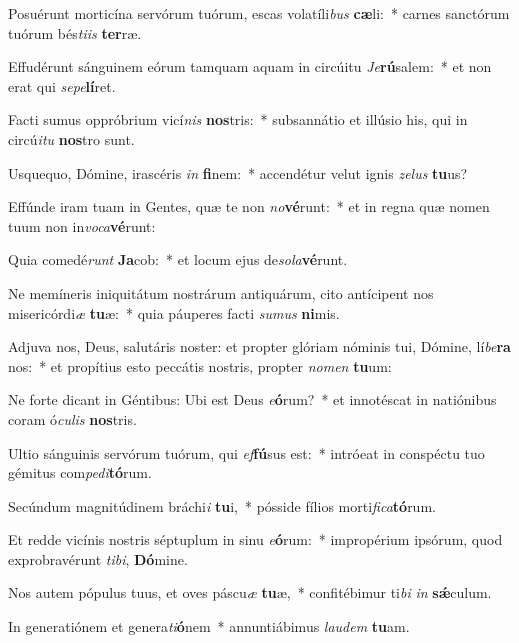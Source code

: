 \item Posuérunt morticína servórum tuórum, escas volatíli\textit{bus} \textbf{cæ}li:~* carnes sanctórum tuórum bés\textit{ti}\textit{is} \textbf{ter}ræ.
\item Effudérunt sánguinem eórum tamquam aquam in circúitu \textit{Je}\textbf{rú}salem:~* et non erat qui \textit{se}\textit{pe}\textbf{lí}ret.
\item Facti sumus oppróbrium vicí\textit{nis} \textbf{nos}tris:~* subsannátio et illúsio his, qui in circú\textit{i}\textit{tu} \textbf{nos}tro sunt.
\item Usquequo, Dómine, irascéris \textit{in} \textbf{fi}nem:~* accendétur velut ignis \textit{ze}\textit{lus} \textbf{tu}us?
\item Effúnde iram tuam in Gentes, quæ te non \textit{no}\textbf{vé}runt:~* et in regna quæ nomen tuum non in\textit{vo}\textit{ca}\textbf{vé}runt:
\item Quia comedé\textit{runt} \textbf{Ja}cob:~* et locum ejus de\textit{so}\textit{la}\textbf{vé}runt.
\item Ne memíneris iniquitátum nostrárum antiquárum, cito antícipent nos misericórdi\textit{æ} \textbf{tu}æ:~* quia páuperes facti \textit{su}\textit{mus} \textbf{ni}mis.
\item Adjuva nos, Deus, salutáris noster: et propter glóriam nóminis tui, Dómine, lí\textit{be}\textbf{ra} nos:~* et propítius esto peccátis nostris, propter \textit{no}\textit{men} \textbf{tu}um:
\item Ne forte dicant in Géntibus: Ubi est Deus \textit{e}\textbf{ó}rum?~* et innotéscat in natiónibus coram ó\textit{cu}\textit{lis} \textbf{nos}tris.
\item Ultio sánguinis servórum tuórum, qui \textit{ef}\textbf{fú}sus est:~* intróeat in conspéctu tuo gémitus com\textit{pe}\textit{di}\textbf{tó}rum.
\item Secúndum magnitúdinem bráchi\textit{i} \textbf{tu}i,~* pósside fílios morti\textit{fi}\textit{ca}\textbf{tó}rum.
\item Et redde vicínis nostris séptuplum in sinu \textit{e}\textbf{ó}rum:~* impropérium ipsórum, quod exprobravérunt \textit{ti}\textit{bi}, \textbf{Dó}mine.
\item Nos autem pópulus tuus, et oves páscu\textit{æ} \textbf{tu}æ,~* confitébimur ti\textit{bi} \textit{in} \textbf{sǽ}culum.
\item In generatiónem et genera\textit{ti}\textbf{ó}nem~* annuntiábimus \textit{lau}\textit{dem} \textbf{tu}am.
